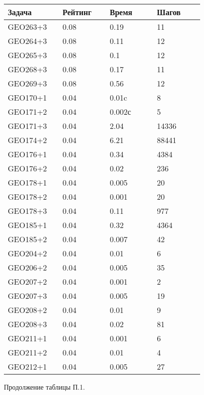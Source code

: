 \begin{longtable}[H]{|p{0.2\linewidth}|p{0.2\linewidth}|p{0.2\linewidth}|p{0.2\linewidth}|}
\hline
\textbf{Задача} & \textbf{Рейтинг} & \textbf{Время} & \textbf{Шагов} \\
\hline
GEO263+3 & 0.08 & 0.19 &  11 \\
\hline
GEO264+3 & 0.08 & 0.11 &  12 \\
\hline
GEO265+3 & 0.08 &  0.1 &  12 \\
\hline
GEO268+3 & 0.08 & 0.17 &  11 \\
\hline
GEO269+3 & 0.08 & 0.56 & 12 \\
\hline
GEO170+1 &  0.04 &  0.01c &  8 \\
\hline
GEO171+2 &  0.04 &  0.002с &  5 \\
\hline
GEO171+3 &  0.04 &  2.04 &  14336 \\
\hline
GEO174+2 &  0.04 &  6.21 &  88441 \\
\hline
GEO176+1 &  0.04 &  0.34 &  4384 \\
\hline
GEO176+2 &  0.04 &  0.02 &  236 \\
\hline
GEO178+1 &  0.04 &  0.005 &  20 \\
\hline
GEO178+2 &  0.04 &  0.001 &  20 \\
\hline
GEO178+3 &  0.04 &  0.11 &  977 \\
\hline
GEO185+1 &  0.04 &  0.32 &  4364 \\
\hline
GEO185+2 &  0.04 &  0.007 &  42 \\
\hline
GEO204+2 &  0.04 &  0.01 &  6 \\
\hline
GEO206+2 &  0.04 &  0.005 &  35 \\
\hline
GEO207+2 &  0.04 &  0.001 &  2 \\
\hline
GEO207+3 &  0.04 &  0.005 &  19 \\
\hline
GEO208+2 &  0.04 &  0.01 &  9 \\
\hline
GEO208+3 &  0.04 &  0.02 &  81 \\
\hline
GEO211+1 &  0.04 &  0.001 &  6 \\
\hline
GEO211+2 &  0.04 &  0.01 &  4 \\
\hline
GEO212+1 &  0.04 &  0.005 &  27 \\
\hline
\end{longtable}
\begin{center}
Продолжение таблицы П.1.
\end{center}

